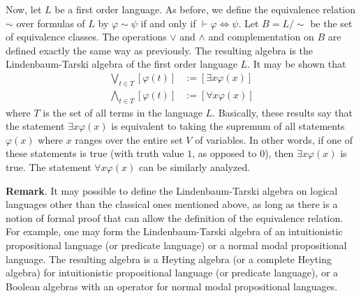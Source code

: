 \documentclass[12pt]{article}
\newcommand{\Iff}{\Leftrightarrow}
\newcommand{\proves}{\vdash}
\begin{document}
Now, let $L$ be a first order language.  As before, we define the equivalence relation $\sim$ over formulas of $L$ by $\varphi\sim\psi$ if and only if $\proves\varphi\Iff\psi$.  Let $B=L/\sim$ be the set of equivalence classes.  The operations $\vee$ and $\wedge$ and complementation on $B$ are defined exactly the same way as previously.  The resulting algebra is the Lindenbaum-Tarski algebra of the first order language $L$.  It may be shown that 
\begin{align*}
\bigvee_{t\in T}[\varphi(t)]&:=[\exists x \varphi(x)]\\
\bigwedge_{t\in T}[\varphi(t)]&:=[\forall x \varphi(x)]
\end{align*}
where $T$ is the set of all terms in the language $L$.  Basically, these results say that the statement $\exists x \varphi(x)$ is equivalent to taking the supremum of all statements $\varphi(x)$ where $x$ ranges over the entire set $V$ of variables.  In other words, if one of these statements is true (with truth value $1$, as opposed to $0$), then $\exists x\varphi(x)$ is true.  The statement $\forall x\varphi(x)$ can be similarly analyzed.

\textbf{Remark}.  It may possible to define the Lindenbaum-Tarski algebra on logical languages other than the classical ones mentioned above, as long as there is a notion of formal proof that can allow the definition of the equivalence relation.  For example, one may form the Lindenbaum-Tarski algebra of an intuitionistic propositional language (or predicate language) or a normal modal propositional language.  The resulting algebra is a Heyting algebra (or a complete Heyting algebra) for intuitionistic propositional language (or predicate language), or a Boolean algebras with an operator for normal modal propositional languages.

\end{document}
